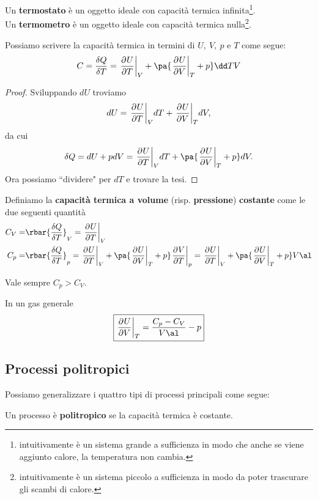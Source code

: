 \begin{definition}
Un \textbf{termostato} \`e un oggetto ideale con capacit\`a termica infinita\footnote{intuitivamente \`e un sistema grande a sufficienza in modo che anche se viene aggiunto calore, la temperatura non cambia.}.\\ 
Un \textbf{termometro} \`e un oggetto ideale con capacit\`a termica nulla\footnote{intuitivamente \`e un sistema piccolo a sufficienza in modo da poter trascurare gli scambi di calore.}.
\end{definition}

\begin{remark}
Possiamo scrivere la capacit\`a termica in termini di $U,\ V,\ p$ e $T$ come segue:
\[C=\frac{\delta Q}{\delta T}=\ppb TUV+\pa{\ppb VUT+p}\dd TV\]
\end{remark}
\begin{proof}
Sviluppando $dU$ troviamo
\[dU=\ppb TUVdT+\ppb VUTdV,\]
da cui
\[\delta Q=dU+pdV=\ppb TUVdT+\pa{\ppb VUT+p}dV.\]
Ora possiamo ``dividere" per $dT$ e trovare la tesi.
\end{proof}

\begin{definition}
Definiamo la \textbf{capacit\`a termica a volume} (risp. \textbf{pressione}) \textbf{costante} come le due seguenti quantit\`a
\begin{align*}
C_V=&\rbar{\frac{\delta Q}{\delta T}}_V=\ppb TUV\\
C_p=&\rbar{\frac{\delta Q}{\delta T}}_p=\ppb TUV +\pa{\ppb VUT+p}\ppb TVp=\ppb TUV +\pa{\ppb VUT+p}V\al
\end{align*}
\end{definition}

\begin{remark}\label{DisguguaglianzaCapacitaTermiche}
Vale sempre $C_p>C_V$.
\end{remark}

\begin{remark}\label{DerivataEnergiaInternaRispettoAlVolume}
In un gas generale
\[\boxed{\ppb VUT=\frac{C_p-C_V}{V\al}-p}\]
\end{remark}

\subsection{Processi politropici}
Possiamo generalizzare i quattro tipi di processi principali come segue:
\begin{definition}
Un processo \`e \textbf{politropico} se la capacit\`a termica \`e costante.
\end{definition}

